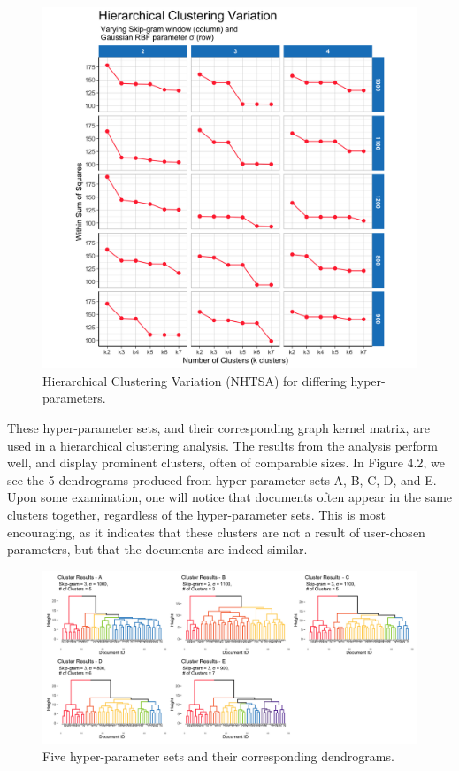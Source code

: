 \begin{figure}
\includegraphics[width=6in]{Content/Images/hclust_variation.png}
\caption{Hierarchical Clustering Variation (NHTSA) for differing hyper-parameters.}
\end{figure}

These hyper-parameter sets, and their corresponding graph kernel matrix, are used in a hierarchical clustering analysis. The results from the analysis perform well, and display prominent clusters, often of comparable sizes. In Figure 4.2, we see the 5 dendrograms produced from hyper-parameter sets A, B, C, D, and E. Upon some examination, one will notice that documents often appear in the same clusters together, regardless of the hyper-parameter sets. This is most encouraging, as it indicates that these clusters are not a result of user-chosen parameters, but that the documents are indeed similar. \\

\begin{figure}
\includegraphics[width=6in]{Content/Images/5cluster.png}
\caption{Five hyper-parameter sets and their corresponding dendrograms.}
\end{figure}


